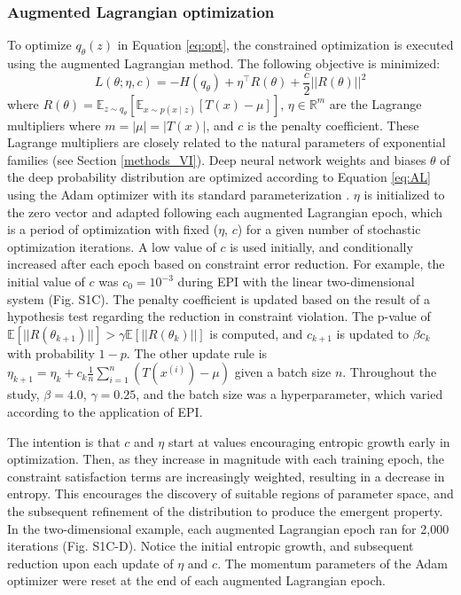 \documentclass[11pt]{article}
\begin{document}
\subsubsection{Augmented Lagrangian optimization}\label{methods_AL_opt}
To optimize $q_\theta(z)$ in Equation \ref{eq:opt}, the constrained optimization is executed using the augmented Lagrangian method.  The following objective is minimized:
\begin{equation} \label{eq:AL}
L(\theta; \eta, c) = -H(q_\theta) + \eta^\top R(\theta) + \frac{c}{2}||R(\theta)||^2
\end{equation}
where $R(\theta) = \mathbb{E}_{z \sim q_\theta}\left[ \mathbb{E}_{x\sim p(x \mid z)}\left[T(x) - \mu \right] \right]$, $\eta \in \mathbb{R}^m$ are the Lagrange multipliers where $m = |\mu| = |T(x)|$,  and $c$ is the penalty coefficient. 
These Lagrange multipliers are closely related to the natural parameters of exponential families (see Section \ref{methods_VI}).
Deep neural network weights and biases $\theta$ of the deep probability distribution are optimized according to Equation \ref{eq:AL} using the Adam optimizer with its standard parameterization \cite{kingma2014adam}.
$\eta$ is initialized to the zero vector and adapted following each augmented Lagrangian epoch, which is a period of optimization with fixed ($\eta$, $c$) for a given number of stochastic optimization iterations. 
A low value of $c$ is used initially, and conditionally increased after each epoch based on constraint error reduction.
For example, the initial value of $c$ was $c_0 = 10^{-3}$ during EPI with the linear two-dimensional system (Fig. S1C).
The penalty coefficient is updated based on the result of a hypothesis test regarding the reduction in constraint violation.  
The p-value of $\mathbb{E}[||R(\theta_{k+1})||] > \gamma \mathbb{E} \left[||R(\theta_{k})|| \right]$ is computed, and $c_{k+1}$ is updated  to $\beta c_k$ with probability $1-p$.  
The other update rule is $\eta_{k+1} = \eta_k + c_k \frac{1}{n} \sum_{i=1}^n (T(x^{(i)}) - \mu)$ given a batch size $n$.
Throughout the study, $\beta = 4.0$, $\gamma = 0.25$, and the batch size was a hyperparameter, which varied according to the application of EPI.

The intention is that $c$ and $\eta$ start at values encouraging entropic growth early in optimization.  
Then, as they increase in magnitude with each training epoch, the constraint satisfaction terms are increasingly weighted, resulting in a decrease in entropy.
This encourages the discovery of suitable regions of parameter space, and the subsequent refinement of the distribution to produce the emergent property.
In the two-dimensional example, each augmented Lagrangian epoch ran for 2,000 iterations (Fig. S1C-D).
Notice the initial entropic growth, and subsequent reduction upon each update of $\eta$ and $c$.
The momentum parameters of the Adam optimizer were reset at the end of each augmented Lagrangian epoch.
\end{document}
